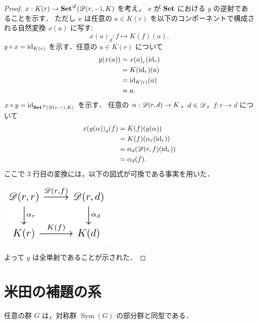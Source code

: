 \documentclass[titlepage]{ltjsreport}
\newtheorem[S]{theorem}{定理}[chapter]
\newtheorem[S]{definition}[theorem]{定義}
\newtheorem[S]{example}[theorem]{例}
\begin{document}
\begin{proof}
  $x:K(r)\to\mathbf{Set}^{\mathscr{D}}(\mathscr{D}(r,-),K)$ を考え，
  $x$ が $\mathbf{Set}$ における $y$ の逆射であることを示す．
  ただし $x$ は任意の $a\in K(r)$ を以下のコンポーネントで構成される自然変換
  $x(a)$ に写す:
  \begin{equation}
    {x(a)}_d:f\mapsto K(f)(a).
  \end{equation}
  $y\circ x=\mathrm{id}_{K(r)}$ を示す．任意の $a\in K(r)$ について
  \begin{align*}
    y(x(a)) & ={x(a)}_r(\mathrm{id}_{r}) \\
            & =K(\mathrm{id}_{r})(a)     \\
            & =\mathrm{id}_{K(r)}(a)     \\
            & =a.
  \end{align*}
  $x\circ y=\mathrm{id}_{\mathbf{Set}^{\mathscr{D}}(\mathscr{D}(r,-),K)}$ を示す．
  任意の $\alpha:\mathscr{D}(r,d)\to K$，$d\in\mathscr{D}$，$f:r\to d$
  について
  \begin{align*}
    {x(y(\alpha))}_d(f) & =K(f)(y(\alpha))                       \\
                        & =K(f)(\alpha_r(\mathrm{id}_{r}))                \\
                        & =\alpha_d(\mathscr{D}(r,f)(\mathrm{id}_{r})) \\
                        & =\alpha_d(f).
  \end{align*}
  ここで 3 行目の変換には，以下の図式が可換である事実を用いた．
  \begin{center}
    \centering
    \includegraphics{src/yoneda}
  \end{center}
  よって $y$ は全単射であることが示された．
\end{proof}

\section{米田の補題の系}

\begin{theorem}
  任意の群 $G$ は，対称群 $\operatorname{Sym}(G)$ の部分群と同型である．
\end{theorem}
\end{document}
